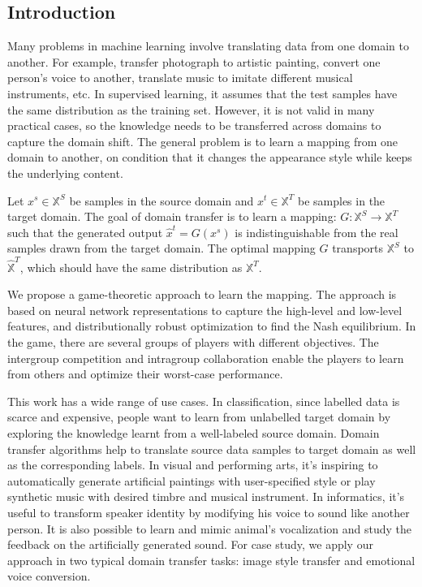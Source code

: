 \documentclass{article}
\begin{document}

\subsection{Introduction}
Many problems in machine learning involve translating data from one domain to another. For example, transfer photograph to artistic painting, convert one person's voice to another, translate music to imitate different musical instruments, etc. In supervised learning, it assumes that the test samples have the same distribution as the training set. However, it is not valid in many practical cases, so the knowledge needs to be transferred across domains to capture the domain shift. The general problem is to learn a mapping from one domain to another, on condition that it changes the appearance style while keeps the underlying content.

Let $x^s \in \mathbb{X}^S$ be samples in the source domain and $x^t \in \mathbb{X}^T$ be samples in the target domain. The goal of domain transfer is to learn a mapping: $G: \mathbb{X}^S \rightarrow \mathbb{X}^T$ such that the generated output $\hat{x}^t = G(x^s)$ is indistinguishable from the real samples drawn from the target domain. The optimal mapping $G$ transports $\mathbb{X}^S$ to $\mathbb{\hat{X}}^T$, which should have the same distribution as $\mathbb{X}^T$.

We propose a game-theoretic approach to learn the mapping. The approach is based on neural network representations to capture the high-level and low-level features, and distributionally robust optimization to find the Nash equilibrium. In the game, there are several groups of players with different objectives. The intergroup competition and intragroup collaboration enable the players to learn from others and optimize their worst-case performance.

This work has a wide range of use cases. In classification, since labelled data is scarce and expensive, people want to learn from unlabelled target domain by exploring the knowledge learnt from a well-labeled source domain. Domain transfer algorithms help to translate source data samples to target domain as well as the corresponding labels. In visual and performing arts, it's inspiring to automatically generate artificial paintings with user-specified style or play synthetic music with desired timbre and musical instrument. In informatics, it's useful to transform speaker identity by modifying his voice to sound like another person. It is also possible to learn and mimic animal's vocalization and study the feedback on the artificially generated sound. For case study, we apply our approach in two typical domain transfer tasks: image style transfer and emotional voice conversion.
\end{document}
